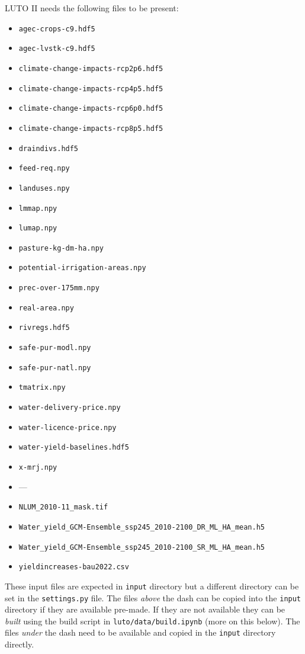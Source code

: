 \documentclass[12pt,a4paper,twoside]{article}
\begin{document}
LUTO II needs the following files to be present:
\begin{itemize}
\setlength{\itemsep}{0pt}\setlength{\parskip}{0pt}\setlength{\itemindent}{-.3cm}
	\item \texttt{agec-crops-c9.hdf5}
	\item \texttt{agec-lvstk-c9.hdf5}
	\item \texttt{climate-change-impacts-rcp2p6.hdf5}
	\item \texttt{climate-change-impacts-rcp4p5.hdf5}
	\item \texttt{climate-change-impacts-rcp6p0.hdf5}
	\item \texttt{climate-change-impacts-rcp8p5.hdf5}
	\item \texttt{draindivs.hdf5}
	\item \texttt{feed-req.npy}
	\item \texttt{landuses.npy}
	\item \texttt{lmmap.npy}
	\item \texttt{lumap.npy}
	\item \texttt{pasture-kg-dm-ha.npy}
	\item \texttt{potential-irrigation-areas.npy}
	\item \texttt{prec-over-175mm.npy}
	\item \texttt{real-area.npy}
	\item \texttt{rivregs.hdf5}
	\item \texttt{safe-pur-modl.npy}
	\item \texttt{safe-pur-natl.npy}
	\item \texttt{tmatrix.npy}
	\item \texttt{water-delivery-price.npy}
	\item \texttt{water-licence-price.npy}
	\item \texttt{water-yield-baselines.hdf5}
	\item \texttt{x-mrj.npy}
	\item [] ---
	\item \texttt{NLUM_2010-11_mask.tif}
	\item \texttt{Water_yield_GCM-Ensemble_ssp245_2010-2100_DR_ML_HA_mean.h5}
	\item \texttt{Water_yield_GCM-Ensemble_ssp245_2010-2100_SR_ML_HA_mean.h5}
	\item \texttt{yieldincreases-bau2022.csv}
\end{itemize}
These input files are expected in \texttt{input} directory but a different directory can be set in the \texttt{settings.py} file. The files \emph{above} the dash can be copied into the \texttt{input} directory if they are available pre-made. If they are not available they can be \emph{built} using the build script in \texttt{luto/data/build.ipynb} (more on this below). The files \emph{under} the dash need to be available and copied in the \texttt{input} directory directly.
\end{document}
